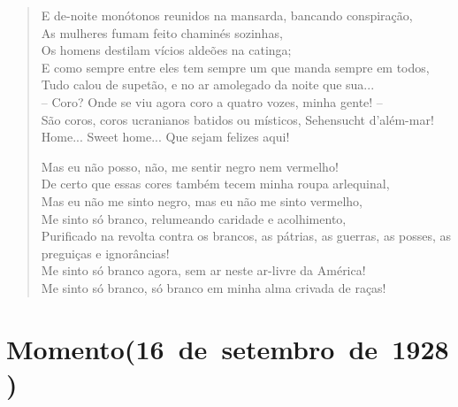 \begin{verse}
E de-noite monótonos reunidos na mansarda, bancando conspiração,\\
As mulheres fumam feito chaminés sozinhas,\\
Os homens destilam vícios aldeões na catinga;\\
E como sempre entre eles tem sempre um que manda sempre em todos,\\
Tudo calou de supetão, e no ar amolegado da noite que sua...\\
-- Coro? Onde se viu agora coro a quatro vozes, minha gente! --\\
São coros, coros ucranianos batidos ou místicos, Sehensucht d'além-mar!\\
Home... Sweet home... Que sejam felizes aqui!

Mas eu não posso, não, me sentir negro nem vermelho!\\
De certo que essas cores também tecem minha roupa arlequinal,\\
Mas eu não me sinto negro, mas eu não me sinto vermelho,\\
Me sinto só branco, relumeando caridade e acolhimento,\\
Purificado na revolta contra os brancos, as pátrias, as guerras, as posses, as
preguiças e ignorâncias!\\
Me sinto só branco agora, sem ar neste ar-livre da América!\\
Me sinto só branco, só branco em minha alma crivada de raças!
\end{verse}

\pagebreak
{}
\section{Momento\break (16~de~setembro~de~1928)}

